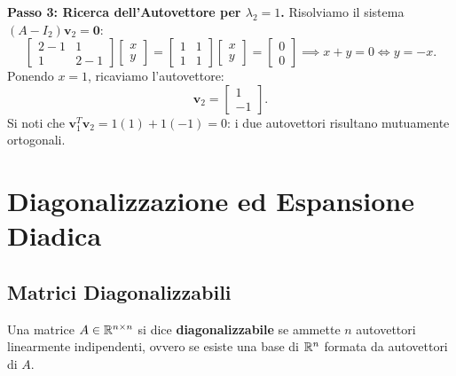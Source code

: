 \begin{example}
\noindent\textbf{Passo 3: Ricerca dell'Autovettore per $\lambda_2 = 1$.}
Risolviamo il sistema $(A - I_2)\mathbf{v}_2 = \mathbf{0}$:
\begin{equation}
    \begin{bmatrix} 2-1 & 1 \\ 1 & 2-1 \end{bmatrix} \begin{bmatrix} x \\ y \end{bmatrix} = \begin{bmatrix} 1 & 1 \\ 1 & 1 \end{bmatrix} \begin{bmatrix} x \\ y \end{bmatrix} = \begin{bmatrix} 0 \\ 0 \end{bmatrix} \implies x + y = 0 \iff y = -x.
\end{equation}
Ponendo $x = 1$, ricaviamo l'autovettore:
\begin{equation}
    \mathbf{v}_2 = \begin{bmatrix} 1 \\ -1 \end{bmatrix}.
\end{equation}
Si noti che $\mathbf{v}_1^T \mathbf{v}_2 = 1(1) + 1(-1) = 0$: i due autovettori risultano mutuamente ortogonali.
\end{example}

\FloatBarrier
\section{Diagonalizzazione ed Espansione Diadica}

\subsection{Matrici Diagonalizzabili}

\begin{definition}[Diagonalizzabilit\`a]
Una matrice $A \in \mathbb{R}^{n \times n}$ si dice \textbf{diagonalizzabile} se ammette $n$ autovettori linearmente indipendenti, ovvero se esiste una base di $\mathbb{R}^n$ formata da autovettori di $A$.
\end{definition}

